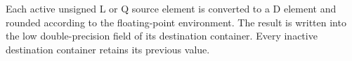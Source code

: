 Each active unsigned L or Q source element is converted to a D element and
rounded according to the floating-point environment. The result is written
into the low double-precision field of its destination container. Every
inactive destination container retains its previous value.
